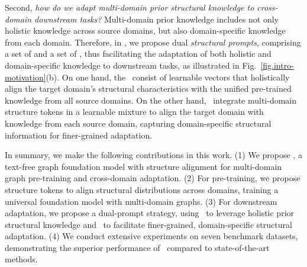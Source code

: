 Second, \textit{how do we adapt multi-domain prior  structural knowledge to cross-domain downstream tasks?} 
Multi-domain prior knowledge includes not only holistic knowledge across source domains, but also domain-specific knowledge from each domain. Therefore, in \model, we %
propose dual \textit{structural prompts}, comprising a set of \textit{\op} and a set of \textit{\cp}, thus facilitating the adaptation of both holistic and domain-specific knowledge to downstream tasks, as illustrated in Fig.~\ref{fig.intro-motivation}(b). On one hand, the \op\ consist of learnable vectors that holistically align the target domain's structural characteristics with the unified pre-trained knowledge from all source domains. On the other hand, \cp\ integrate multi-domain structure tokens in a learnable mixture to align the target domain with  knowledge from each source domain, capturing domain-specific structural information for finer-grained adaptation.

In summary, we make the following contributions in this work.
(1) We propose \model, a text-free graph foundation model with structure alignment for multi-domain graph pre-training and cross-domain adaptation.
(2) For pre-training, we propose structure tokens to align structural distributions across domains, training a universal foundation model with multi-domain graphs.
(3) For downstream adaptation, we propose a dual-prompt strategy, using \op\ to leverage holistic prior structural knowledge and \cp\ to facilitate finer-grained, domain-specific structural adaptation.
(4) We conduct extensive experiments on seven benchmark datasets, demonstrating the superior performance of \model\ compared to state-of-the-art methods.
